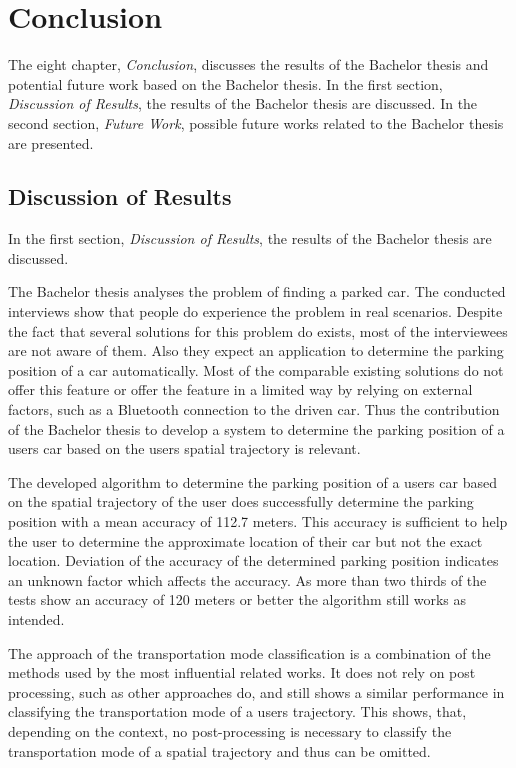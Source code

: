 \chapter{Conclusion}
The eight chapter, \textit{Conclusion}, discusses the results of the Bachelor thesis and potential future work based on the Bachelor thesis. In the first section, \textit{Discussion of Results}, the results of the Bachelor thesis are discussed. In the second section, \textit{Future Work}, possible future works related to the Bachelor thesis are presented. 

\section{Discussion of Results}
In the first section, \textit{Discussion of Results}, the results of the Bachelor thesis are discussed.


The Bachelor thesis analyses the problem of finding a parked car. The conducted interviews show that people do experience the problem in real scenarios. Despite the fact that several solutions for this problem do exists, most of the interviewees are not aware of them. Also they expect an application to determine the parking position of a car automatically. Most of the comparable existing solutions do not offer this feature or offer the feature in a limited way by relying on external factors, such as a Bluetooth connection to the driven car. Thus the contribution of the Bachelor thesis to develop a system to determine the parking position of a users car based on the users spatial trajectory is relevant.


The developed algorithm to determine the parking position of a users car based on the spatial trajectory of the user does successfully determine the parking position with a mean accuracy of 112.7 meters. This accuracy is sufficient to help the user to determine the approximate location of their car but not the exact location. Deviation of the accuracy of the determined parking position indicates an unknown factor which affects the accuracy. As more than two thirds of the tests show an accuracy of 120 meters or better the algorithm still works as intended. 

The approach of the transportation mode classification is a combination of the methods used by the most influential related works. It does not rely on post processing, such as other approaches do, and still shows a similar performance in classifying the transportation mode of a users trajectory. This shows, that, depending on the context, no post-processing is necessary to classify the transportation mode of a spatial trajectory and thus can be omitted.


